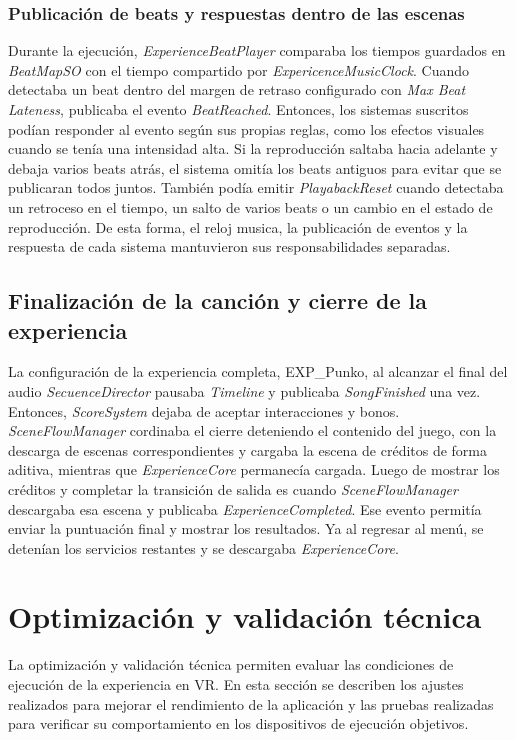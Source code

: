 \subsubsection{Publicación de beats y respuestas dentro de las escenas}
Durante la ejecución, \emph{ExperienceBeatPlayer} comparaba los tiempos guardados en \emph{BeatMapSO} con el tiempo compartido por \emph{ExpericenceMusicClock}. Cuando detectaba un beat dentro del margen de retraso configurado con \emph{Max Beat Lateness}, publicaba el evento \emph{BeatReached}. 
Entonces, los sistemas suscritos podían responder al evento según sus propias reglas, como los efectos visuales cuando se tenía una intensidad alta.
Si la reproducción saltaba hacia adelante y debaja varios beats atrás, el sistema omitía los beats antiguos para evitar que se publicaran todos juntos. También podía emitir \emph{PlayabackReset} cuando detectaba un retroceso en el tiempo, un salto de varios beats o un cambio en el estado de reproducción. De esta forma, el reloj musica, la publicación de eventos y la respuesta de cada sistema mantuvieron sus responsabilidades separadas.

\subsection{Finalización de la canción y cierre de la experiencia}
La configuración de la experiencia completa, EXP\_Punko, al alcanzar el final del audio \emph{SecuenceDirector} pausaba \emph{Timeline} y publicaba \emph{SongFinished} una vez.
Entonces, \emph{ScoreSystem} dejaba de aceptar interacciones y bonos. \emph{SceneFlowManager} cordinaba el cierre deteniendo el contenido del juego, con la descarga de escenas correspondientes y cargaba la escena de créditos de forma aditiva, mientras que \emph{ExperienceCore} permanecía cargada. 
Luego de mostrar los créditos y completar la transición de salida es cuando \emph{SceneFlowManager} descargaba esa escena y publicaba \emph{ExperienceCompleted}. Ese evento permitía enviar la puntuación final y mostrar los resultados. Ya al regresar al menú, se detenían los servicios restantes y se descargaba \emph{ExperienceCore}.

\section{Optimización y validación técnica}
La optimización y validación técnica permiten evaluar las condiciones
de ejecución de la experiencia en VR. En esta sección se describen los ajustes realizados para mejorar el rendimiento de la aplicación
y las pruebas realizadas para verificar su comportamiento en los dispositivos de ejecución objetivos. 

